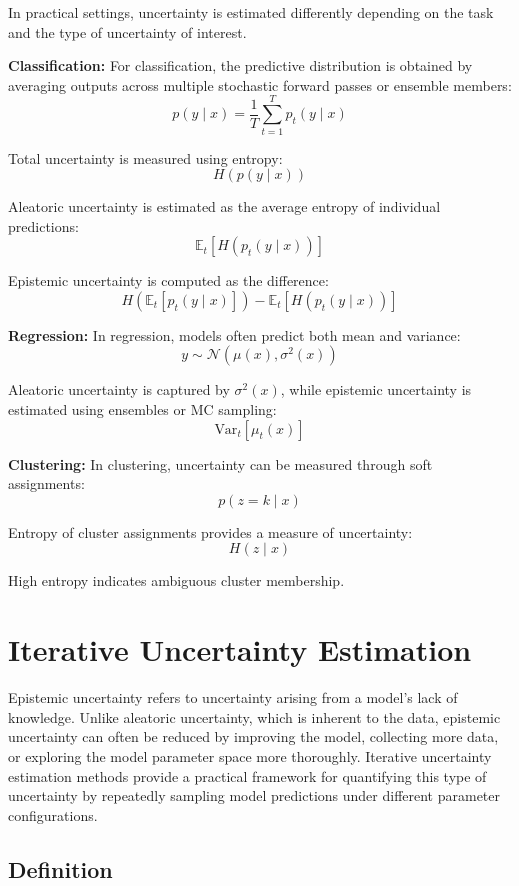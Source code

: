 \documentclass{article}
\begin{document}
In practical settings, uncertainty is estimated differently depending on the task and the type of uncertainty of interest.

\textbf{Classification:}  
For classification, the predictive distribution is obtained by averaging outputs across multiple stochastic forward passes or ensemble members:
\[
p(y \mid x) = \frac{1}{T} \sum_{t=1}^{T} p_t(y \mid x)
\]

Total uncertainty is measured using entropy:
\[
H(p(y \mid x))
\]

Aleatoric uncertainty is estimated as the average entropy of individual predictions:
\[
\mathbb{E}_{t}[H(p_t(y \mid x))]
\]

Epistemic uncertainty is computed as the difference:
\[
H\left(\mathbb{E}_{t}[p_t(y \mid x)]\right) - \mathbb{E}_{t}[H(p_t(y \mid x))]
\]

\textbf{Regression:}  
In regression, models often predict both mean and variance:
\[
y \sim \mathcal{N}(\mu(x), \sigma^2(x))
\]

Aleatoric uncertainty is captured by $\sigma^2(x)$, while epistemic uncertainty is estimated using ensembles or MC sampling:
\[
\text{Var}_{t}[\mu_t(x)]
\]

\textbf{Clustering:}  
In clustering, uncertainty can be measured through soft assignments:
\[
p(z = k \mid x)
\]

Entropy of cluster assignments provides a measure of uncertainty:
\[
H(z \mid x)
\]

High entropy indicates ambiguous cluster membership.


\section{Iterative Uncertainty Estimation}

Epistemic uncertainty refers to uncertainty arising from a model’s lack of knowledge. Unlike aleatoric uncertainty, which is inherent to the data, epistemic uncertainty can often be reduced by improving the model, collecting more data, or exploring the model parameter space more thoroughly. Iterative uncertainty estimation methods provide a practical framework for quantifying this type of uncertainty by repeatedly sampling model predictions under different parameter configurations.

\subsection{Definition}
\end{document}

